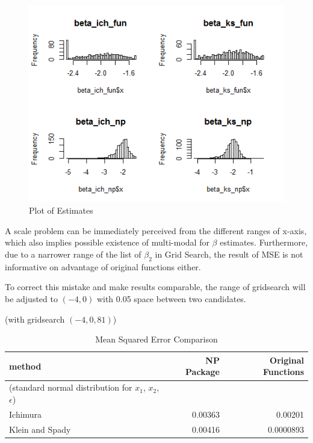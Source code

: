 \documentclass[a4paper]{article}
\begin{document}
\begin{figure}[h!]
  \caption{Plot of Estimates}
  \includegraphics[width=\linewidth]{comparison_np_fun_plot.png}
 
  \label{fig:plot of estimates}
\end{figure}

A scale problem can be immediately perceived from the different ranges of x-axis, which also implies possible existence of multi-modal for $\beta$ estimates. Furthermore, due to a narrower range of the list of $\beta_2$ in Grid Search, the result of MSE is not informative on advantage of original functions either. 

To correct this mistake and make results comparable, the range of gridsearch will be adjusted to $(-4,0)$ with 0.05 space between two candidates.

\begin{table}[H]
\caption {Mean Squared Error Comparison} \label{tab:mean squared error}

(with gridsearch $(-4, 0, 81)$)

\begin{tabular}{l r r}

\toprule
\textbf{method} & \textbf{NP Package} & \textbf{Original Functions} \tabularnewline\midrule
(standard normal distribution for $x_1$, $x_2$, $\epsilon$) & &
\tabularnewline
Ichimura & 0.00363 & 0.00201 \tabularnewline
Klein and Spady & 0.00416 & 0.0000893 \tabularnewline

\bottomrule
\end{tabular}
\end{table}
\end{document}
